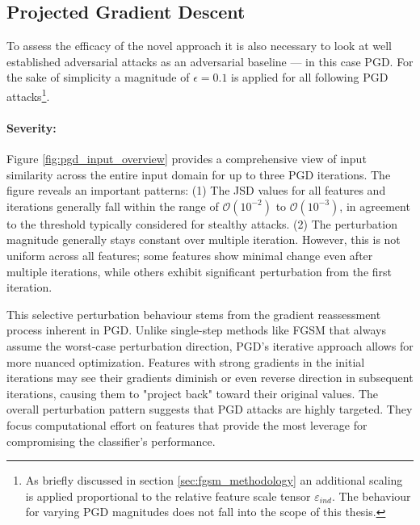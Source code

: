 \FloatBarrier
\subsection{Projected Gradient Descent}

To assess the efficacy of the novel approach it is also necessary to look at well established adversarial attacks as an adversarial baseline — in this case PGD. For the sake of simplicity a magnitude of $\epsilon=0.1$ is applied for all following PGD attacks\footnote{As briefly discussed in section \ref{sec:fgsm_methodology} an additional scaling is applied proportional to the relative feature scale tensor $\varepsilon_{ind}$. The behaviour for varying PGD magnitudes does not fall into the scope of this thesis.}.

\paragraph{Severity:} Figure \ref{fig:pgd_input_overview} provides a comprehensive view of input similarity across the entire input domain for up to three PGD iterations. The figure reveals an important patterns: 
(1) The JSD values for all features and iterations generally fall within the range of $\mathcal{O}(10^{-2})$ to $\mathcal{O}(10^{-3})$, in agreement to the threshold typically considered for stealthy attacks.
(2) The perturbation magnitude generally stays constant over multiple iteration. However, this is not uniform across all features; some features show minimal change even after multiple iterations, while others exhibit significant perturbation from the first iteration.

This selective perturbation behaviour stems from the gradient reassessment process inherent in PGD. Unlike single-step methods like FGSM that always assume the worst-case perturbation direction, PGD's iterative approach allows for more nuanced optimization. Features with strong gradients in the initial iterations may see their gradients diminish or even reverse direction in subsequent iterations, causing them to "project back" toward their original values. The overall perturbation pattern suggests that PGD attacks are highly targeted. They focus computational effort on features that provide the most leverage for compromising the classifier's performance.

